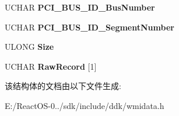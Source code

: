 \begin{DoxyCompactItemize}
\mbox{\label{struct___m_s_m_c_a_event___p_c_i_bus_error_abeb7396467e03394eb20c036d73d3b6b}} 
U\+C\+H\+AR {\bfseries P\+C\+I\+\_\+\+B\+U\+S\+\_\+\+I\+D\+\_\+\+Bus\+Number}
\item 
\mbox{\label{struct___m_s_m_c_a_event___p_c_i_bus_error_a2795e6212be40f1f7a8be118eecbef29}} 
U\+C\+H\+AR {\bfseries P\+C\+I\+\_\+\+B\+U\+S\+\_\+\+I\+D\+\_\+\+Segment\+Number}
\item 
\mbox{\label{struct___m_s_m_c_a_event___p_c_i_bus_error_a3a5c33e9b78d6542fcf7c3c08fd6d887}} 
U\+L\+O\+NG {\bfseries Size}
\item 
\mbox{\label{struct___m_s_m_c_a_event___p_c_i_bus_error_a06302b6946cc6368ed3816aa8d2c2672}} 
U\+C\+H\+AR {\bfseries Raw\+Record} \mbox{[}1\mbox{]}
\end{DoxyCompactItemize}


该结构体的文档由以下文件生成\+:\begin{DoxyCompactItemize}
\item 
E\+:/\+React\+O\+S-\/0../sdk/include/ddk/wmidata.\+h\end{DoxyCompactItemize}
